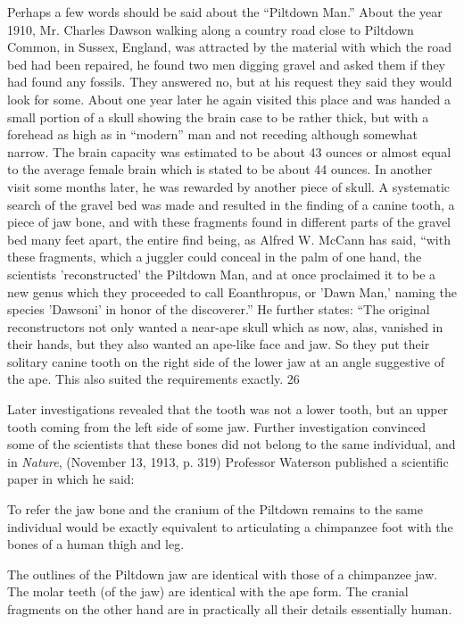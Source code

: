 Perhaps a few words should be said about the ``Piltdown Man.'' About the year 1910, Mr.
Charles Dawson walking along a country road close to Piltdown Common, in Sussex,
England, was attracted by the material with which the road bed had been repaired, he found
two men digging gravel and asked them if they had found any fossils. They answered no, but
at his request they said they would look for some. About one year later he again visited this
place and was handed a small portion of a skull showing the brain case to be rather thick, but
with a forehead as high as in ``modern'' man and not receding although somewhat narrow.
The brain capacity was estimated to be about 43 ounces or almost equal to the average
female brain which is stated to be about 44 ounces. In another visit some months later, he
was rewarded by another piece of skull. A systematic search of the gravel bed was made and
resulted in the finding of a canine tooth, a piece of jaw bone, and with these fragments found
in different parts of the gravel bed many feet apart, the entire find being, as Alfred W.
McCann has said, ``with these fragments, which a juggler could conceal in the palm of one
hand, the scientists 'reconstructed' the Piltdown Man, and at once proclaimed it to be a new
genus which they proceeded to call Eoanthropus, or 'Dawn Man,' naming the species
'Dawsoni' in honor of the discoverer.'' He further states: ``The original reconstructors not only
wanted a near-ape skull which as now, alas, vanished in their hands, but they also wanted an
ape-like face and jaw. So they put their solitary canine tooth on the right side of the lower
jaw at an angle suggestive of the ape. This also suited the requirements exactly. 26

Later investigations revealed that the tooth was not a lower tooth, but an upper tooth coming
from the left side of some jaw. Further investigation convinced some of the scientists that
these bones did not belong to the same individual, and in \textit{Nature}, (November 13, 1913, p.
319) Professor Waterson published a scientific paper in which he said:

To refer the jaw bone and the cranium of the Piltdown remains to the same individual would
be exactly equivalent to articulating a chimpanzee foot with the bones of a human thigh and
leg.

The outlines of the Piltdown jaw are identical with those of a chimpanzee jaw. The molar
teeth (of the jaw) are identical with the ape form. The cranial fragments on the other hand are
in practically all their details essentially human.

